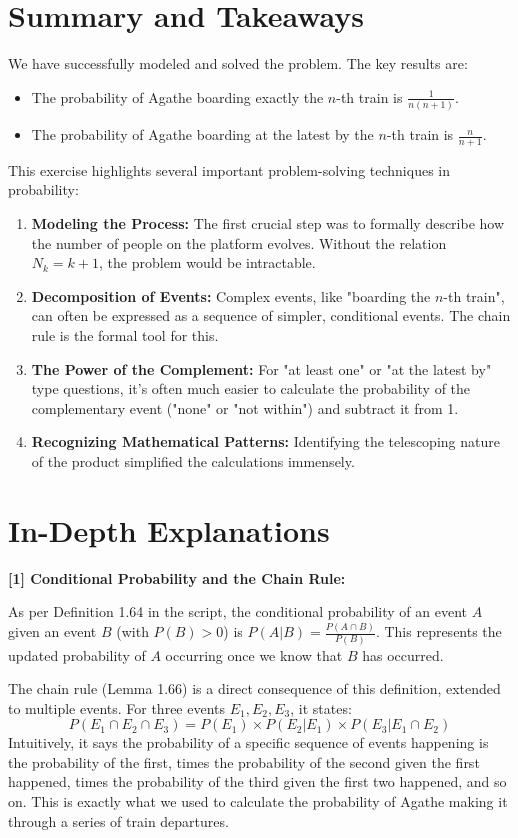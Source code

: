 \documentclass[11pt,a4paper]{article}
\begin{document}
\section{Summary and Takeaways}
We have successfully modeled and solved the problem. The key results are:
\begin{itemize}
    \item The probability of Agathe boarding exactly the $n$-th train is $\frac{1}{n(n+1)}$.
    \item The probability of Agathe boarding at the latest by the $n$-th train is $\frac{n}{n+1}$.
\end{itemize}
This exercise highlights several important problem-solving techniques in probability:
\begin{enumerate}
    \item \textbf{Modeling the Process:} The first crucial step was to formally describe how the number of people on the platform evolves. Without the relation $N_k=k+1$, the problem would be intractable.
    \item \textbf{Decomposition of Events:} Complex events, like "boarding the $n$-th train", can often be expressed as a sequence of simpler, conditional events. The chain rule is the formal tool for this.
    \item \textbf{The Power of the Complement:} For "at least one" or "at the latest by" type questions, it's often much easier to calculate the probability of the complementary event ("none" or "not within") and subtract it from 1.
    \item \textbf{Recognizing Mathematical Patterns:} Identifying the telescoping nature of the product simplified the calculations immensely.
\end{enumerate}

\newpage
\section*{In-Depth Explanations}
\label{note1}
\hypertarget{note1}{\textbf{[1] Conditional Probability and the Chain Rule:}}
As per Definition 1.64 in the script, the conditional probability of an event $A$ given an event $B$ (with $P(B)>0$) is $P(A|B) = \frac{P(A \cap B)}{P(B)}$. This represents the updated probability of $A$ occurring once we know that $B$ has occurred.

The chain rule (Lemma 1.66) is a direct consequence of this definition, extended to multiple events. For three events $E_1, E_2, E_3$, it states:
$$ P(E_1 \cap E_2 \cap E_3) = P(E_1) \times P(E_2 | E_1) \times P(E_3 | E_1 \cap E_2) $$
Intuitively, it says the probability of a specific sequence of events happening is the probability of the first, times the probability of the second given the first happened, times the probability of the third given the first two happened, and so on. This is exactly what we used to calculate the probability of Agathe making it through a series of train departures.
\end{document}
